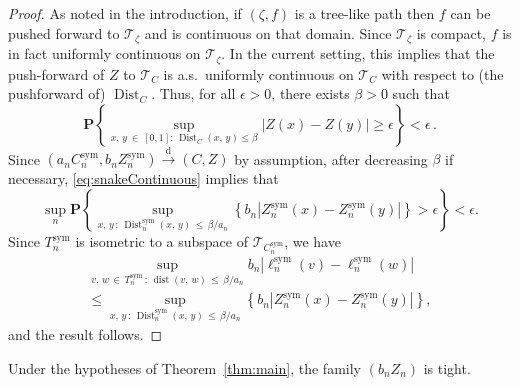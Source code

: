 \documentclass[AHL,Unicode,longabstracts,published]{cedram}
\newcommand{\cT}{\mathcal{T}}
\DeclareMathOperator{\sym}{sym}
\DeclareMathOperator{\dist}{dist}
\DeclareMathOperator{\Dist}{Dist}
\newcommand{\p}[1]{\mathbf{P}\left\{#1\right\}}
\providecommand{\eps}{}
\renewcommand{\eps}{\epsilon}
\newcommand{\convdist}{\ensuremath{\stackrel{\mathrm{d}}{\rightarrow}}}
\begin{document}
\begin{proof}
As noted in the introduction, if $(\zeta,f)$ is a tree-like path then $f$ can be pushed forward to $\cT_\zeta$ and is continuous on that domain. Since $\cT_\zeta$ is compact, $f$ is in fact uniformly continuous on $\cT_\zeta$. In the current setting, this implies that the push-forward of $Z$ to $\cT_C$ is a.s.\ uniformly continuous on $\cT_C$ with respect to (the pushforward of) $\Dist_C$. Thus, for all $\epsilon>0$, there exists $\beta>0$ such that
\begin{equation}\label{eq:snakeContinuous}
\p{\sup_{x,\,y\:\in\,[0,1]:\,\Dist_C(x,\,y) \le \beta} \left|Z(x)-Z(y)\right| \ge \eps} < \eps\,.
\end{equation}
Since $(a_nC_n^{\sym},b_nZ_n^{\sym}) \convdist (C,Z)$ by assumption, after decreasing $\beta$ if necessary, \eqref{eq:snakeContinuous} implies that
\[
\sup_n\p{\sup_{x,\,y\,:\,\Dist_n^{\sym}(x,\,y)\,\le\,\beta/a_n}\left\{b_n\left|Z_n^{\sym}(x)-Z_n^{\sym}(y)\right|\right\}>\eps}<\eps.
\]
Since $T_n^{\sym}$ is isometric to a subspace of $\cT_{C_n^{\sym}}$, we have
\begin{multline*}
\sup_{v,\,w\,\in\,T_n^{\sym}\,:\,\dist(v,\,w)\,\le\,\beta/a_n} b_n \left|\ell^{\sym}_n(v) -\ell^{\sym}_n(w)\right|
\\
\le \sup_{x,\,y\,:\, \Dist_n^{\sym}(x,\,y)\,\le\,\beta/a_n}\left\{b_n\left|Z_n^{\sym}(x)-Z_n^{\sym}(y)\right|\right\},
\end{multline*}
and the result follows.
\end{proof}

\begin{prop}\label{prop:tightness}
Under the hypotheses of Theorem~\ref{thm:main}, the family $(b_nZ_n)$ is tight.
\end{prop}
\end{document}
